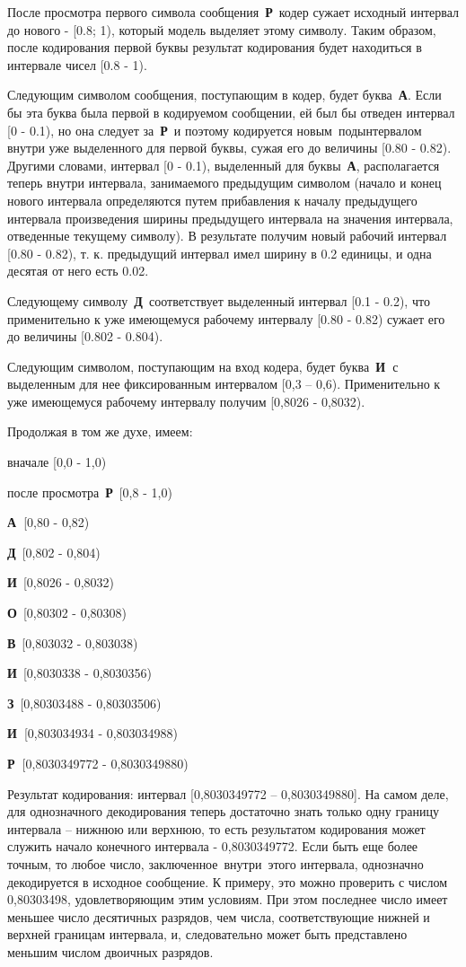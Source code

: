 \documentclass[12pt]{article}
\begin{document}
После просмотра первого символа сообщения~\textbf{Р}~кодер сужает исходный интервал до нового - [0.8; 1), который модель выделяет этому символу. Таким образом, после кодирования первой буквы результат кодирования будет находиться в интервале чисел [0.8 - 1).

Следующим символом сообщения, поступающим в кодер, будет буква~\textbf{А}. Если бы эта буква была первой в кодируемом сообщении, ей был бы отведен интервал [0 - 0.1), но она следует за~\textbf{Р}~и поэтому кодируется новым~подынтервалом внутри уже выделенного для первой буквы, сужая его до величины [0.80 - 0.82). Другими словами, интервал [0 - 0.1), выделенный для буквы~\textbf{А}, располагается теперь внутри интервала, занимаемого предыдущим символом (начало и конец нового интервала определяются путем прибавления к началу предыдущего интервала произведения ширины предыдущего интервала на значения интервала, отведенные текущему символу). В результате получим новый рабочий интервал [0.80 - 0.82), т. к. предыдущий интервал имел ширину в 0.2 единицы, и одна десятая от него есть 0.02.

Следующему символу~\textbf{Д}~соответствует выделенный интервал [0.1 - 0.2), что применительно к уже имеющемуся рабочему интервалу [0.80 - 0.82) сужает его до величины [0.802 - 0.804).

Следующим символом, поступающим на вход кодера, будет буква~\textbf{И~}с выделенным для нее фиксированным интервалом [0,3 -- 0,6). Применительно к уже имеющемуся рабочему интервалу получим [0,8026 - 0,8032).

Продолжая в том же духе, имеем:

вначале [0,0 - 1,0)

после просмотра~\textbf{Р}~[0,8 - 1,0)

\textbf{А~}[0,80 - 0,82)

\textbf{Д}~[0,802 - 0,804)

\textbf{И}~[0,8026 - 0,8032)

\textbf{О}~[0,80302 - 0,80308)

\textbf{В}~[0,803032 - 0,803038)

\textbf{И}~[0,8030338 - 0,8030356)

\textbf{З}~[0,80303488 - 0,80303506)

\textbf{И~}[0,803034934 - 0,803034988)

\textbf{Р~}[0,8030349772 - 0,8030349880)

Результат кодирования: интервал [0,8030349772 -- 0,8030349880]. На самом деле, для однозначного декодирования теперь достаточно знать только одну границу интервала -- нижнюю или верхнюю, то есть результатом кодирования может служить начало конечного интервала - 0,8030349772. Если быть еще более точным, то любое число, заключенное~внутри~этого интервала, однозначно декодируется в исходное сообщение. К примеру, это можно проверить с числом 0,80303498, удовлетворяющим этим условиям. При этом последнее число имеет меньшее число десятичных разрядов, чем числа, соответствующие нижней и верхней границам интервала, и, следовательно может быть представлено меньшим числом двоичных разрядов.
\end{document}
